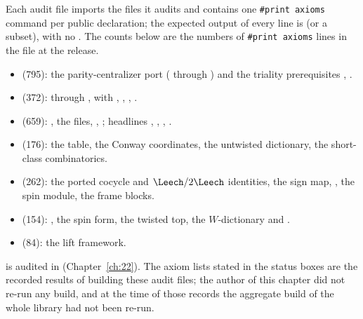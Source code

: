 Each audit file imports the files it audits and contains one \texttt{\#print axioms} command per public
declaration; the expected output of every line is  (or a
subset), with no .  The counts below are the numbers of \texttt{\#print axioms} lines in the
file at the release.
\begin{itemize}
\item {} (795): the parity-centralizer port
  ( through ) and the triality prerequisites
  , .
\item {} (372):  through
  , with , , , .
\item {} (659): ,
  the  files, , ; headlines
  , , , .
\item {} (176): the table, the Conway coordinates, the
  untwisted dictionary, the short-class combinatorics.
\item {} (262): the ported cocycle and
  $\Leech/2\Leech$ identities, the sign map, , the spin module, the frame blocks.
\item {} (154): , the spin form,
  the twisted top, the $W$-dictionary and .
\item {} (84): the lift framework.
\end{itemize}
 is audited in  (Chapter~\ref{ch:22}).
The axiom lists stated in the status boxes are the recorded results of building these audit files; the
author of this chapter did not re-run any build, and at the time of those records the aggregate build of
the whole library had not been re-run.

